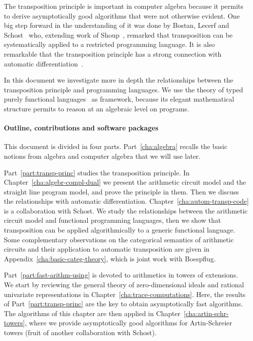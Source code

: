 The transposition principle is important in computer algebra because
it permits to derive asymptotically good algorithms that were not
otherwise evident. One big step forward in the understanding of it was
done by Bostan, Lecerf and Schost~\cite{bostan+lecerf+schost:tellegen}
who, extending work of Shoup~\cite{shoup95}, remarked that
transposition can be systematically applied to a restricted
programming language. It is also remarkable that the transposition
principle has a strong connection with automatic
differentiation~\cite{baur+strassen83,kaltofen+lakshman89,Ka2K,gashkov+gashkov05,sergeev08}.

In this document we investigate more in depth the relationships
between the transposition principle and programming languages. We use
the theory of typed purely functional languages~\cite{pierce} as
framework, because its elegant mathematical structure permits to
reason at an algebraic level on programs.


\paragraph{Outline, contributions and software packages}
\label{sec:outl-contr}
This document is divided in four parts. Part~\ref{cha:algebra} recalls
the basic notions from algebra and computer algebra that we will use
later.

Part~\ref{part:transp-princ} studies the transposition principle. In
Chapter~\ref{cha:algebr-compl-dual} we present the arithmetic circuit
model and the straight line program model, and prove the principle in
them. Then we discuss the relationships with automatic
differentiation. Chapter~\ref{cha:autom-transp-code} is a
collaboration with Schost. We study the relationships between the
arithmetic circuit model and functional programming languages, then we
show that transposition can be applied algorithmically to a generic
functional language. Some complementary observations on the
categorical semantics of arithmetic circuits and their application to
automatic transposition are given in
Appendix~\ref{cha:basic-categ-theory}, which is joint work with
Boespflug.

Part~\ref{part:fast-arithm-using} is devoted to arithmetics in towers
of extensions. We start by reviewing the general theory of
zero-dimensional ideals and rational univariate representations in
Chapter~\ref{cha:trace-computations}. Here, the results of
Part~\ref{part:transp-princ} are the key to obtain asymptotically fast
algorithms. The algorithms of this chapter are then applied in
Chapter~\ref{cha:artin-schr-towers}, where we provide asymptotically
good algorithms for Artin-Schreier towers (fruit of another
collaboration with Schost).

